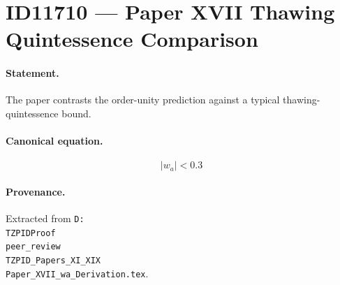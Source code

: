 \section*{ID11710 --- Paper XVII Thawing Quintessence Comparison}

\paragraph{Statement.}
The paper contrasts the order-unity prediction against a typical thawing-quintessence bound.

\paragraph{Canonical equation.}
\[
|w_a|<0.3
\]

\paragraph{Provenance.}
Extracted from \texttt{D:\\TZPIDProof\\peer\_review\\TZPID\_Papers\_XI\_XIX\\Paper\_XVII\_wa\_Derivation.tex}.
